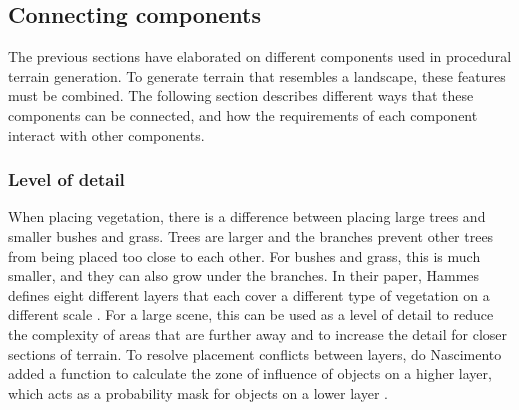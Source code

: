

\subsection{Connecting components}
The previous sections have elaborated on different components used in procedural terrain generation. To generate terrain that resembles a landscape, these features must be combined. The following section describes different ways that these components can be connected, and how the requirements of each component interact with other components.

\subsubsection{Level of detail}
When placing vegetation, there is a difference between placing large trees and smaller bushes and grass. Trees are larger and the branches prevent other trees from being placed too close to each other. For bushes and grass, this is much smaller, and they can also grow under the branches. In their paper, Hammes defines eight different layers that each cover a different type of vegetation on a different scale \cite{hammes_modeling_2001}. For a large scene, this can be used as a level of detail to reduce the complexity of areas that are further away and to increase the detail for closer sections of terrain. To resolve placement conflicts between layers, do Nascimento added a function to calculate the zone of influence of objects on a higher layer, which acts as a probability mask for objects on a lower layer \cite{do_nascimento_gpu-based_2018}.

